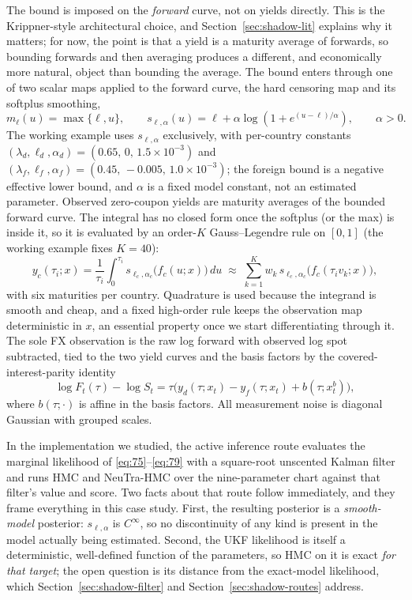 \documentclass[11pt]{article}
\begin{document}
The bound is imposed on the \emph{forward} curve, not on yields
directly. This is the Krippner-style architectural choice, and
Section~\ref{sec:shadow-lit} explains why it matters; for now, the point is
that a yield is a maturity average of forwards, so bounding forwards
and then averaging produces a different, and economically more
natural, object than bounding the average. The bound enters through
one of two scalar maps applied to the forward curve, the hard censoring
map and its softplus smoothing,
\begin{equation}\label{eq:77}
 m_\ell(u)=\max\{\ell,u\},
 \qquad
 s_{\ell,\alpha}(u)=\ell+\alpha\log\!\left(1+e^{(u-\ell)/\alpha}\right),
 \qquad \alpha>0.
\end{equation}
The working example uses \(s_{\ell,\alpha}\) exclusively, with
per-country constants
\((\lambda_d,\ell_d,\alpha_d)=(0.65,\,0,\,1.5\times10^{-3})\) and
\((\lambda_f,\ell_f,\alpha_f)=(0.45,\,-0.005,\,1.0\times10^{-3})\); the
foreign bound is a negative effective lower bound, and \(\alpha\) is a
fixed model constant, not an estimated parameter. Observed zero-coupon
yields are maturity averages of the bounded forward curve. The integral
has no closed form once the softplus (or the max) is inside it, so it
is evaluated by an order-\(K\) Gauss--Legendre rule on \([0,1]\) (the
working example fixes \(K=40\)):
\begin{equation}\label{eq:78}
 y_c(\tau_i;x)=\frac1{\tau_i}\int_0^{\tau_i}
 s_{\ell_c,\alpha_c}\bigl(f_c(u;x)\bigr)\,du
 \;\approx\;\sum_{k=1}^{K}w_k\,
 s_{\ell_c,\alpha_c}\bigl(f_c(\tau_i v_k;x)\bigr),
\end{equation}
with six maturities per country. Quadrature is used because the
integrand is smooth and cheap, and a fixed high-order rule keeps the
observation map deterministic in \(x\), an essential property once
we start differentiating through it. The sole FX observation is the raw
log forward with observed log spot subtracted, tied to the two yield
curves and the basis factors by the covered-interest-parity identity
\begin{equation}\label{eq:79}
 \log F_t(\tau)-\log S_t=\tau\bigl(
 y_d(\tau;x_t)-y_f(\tau;x_t)+b(\tau;x_t^b)\bigr),
\end{equation}
where \(b(\tau;\cdot)\) is affine in the basis factors. All measurement
noise is diagonal Gaussian with grouped scales.

In the implementation we studied, the active inference route evaluates
the marginal likelihood of \eqref{eq:75}--\eqref{eq:79} with a
square-root unscented Kalman filter and runs HMC and NeuTra-HMC over
the nine-parameter chart against that filter's value and score. Two
facts about that route follow immediately, and they frame everything
in this case study. First, the resulting posterior is a
\emph{smooth-model} posterior: \(s_{\ell,\alpha}\) is \(C^\infty\), so
no discontinuity of any kind is present in the model actually being
estimated. Second, the UKF likelihood is itself a deterministic,
well-defined function of the parameters, so HMC on it is exact
\emph{for that target}; the open question is its distance from the
exact-model likelihood, which Section~\ref{sec:shadow-filter} and
Section~\ref{sec:shadow-routes} address.
\end{document}
